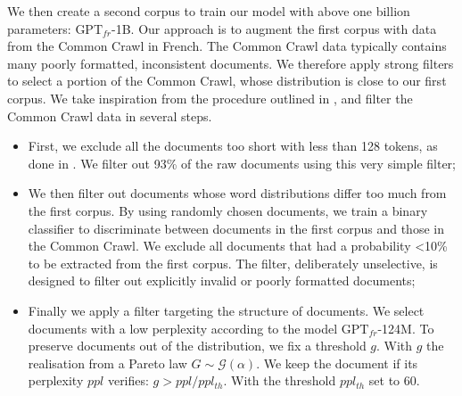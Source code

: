 We then create a second corpus to train our model with above one billion parameters: $\text{GPT}_{fr}$-1B. Our approach is to augment the first corpus with data from the Common Crawl in French. The Common Crawl data typically contains many poorly formatted, inconsistent documents. We therefore apply strong filters to select a portion of the Common Crawl, whose distribution is close to our first corpus. We take inspiration from the procedure outlined in \textcite{brown_20}, and filter the Common Crawl data in several steps.
\begin{itemize}
    \item First, we exclude all the documents too short with less than 128 tokens, as done in \textcite{shoeybi_19}. We filter out 93\% of the raw documents using this very simple filter; 
    \item We then filter out documents whose word distributions differ too much from the first corpus. By using  randomly chosen documents, we train a binary classifier to discriminate between documents in the first corpus and those in the Common Crawl. We exclude all documents that had a probability <10\% to be extracted from the first corpus. The filter, deliberately unselective, is designed to filter out explicitly invalid or poorly formatted documents;
    \item Finally we apply a filter targeting the structure of documents. We select documents with a low perplexity according to the model $\text{GPT}_{fr}$-124M. To preserve documents out of the distribution, we fix a threshold $g$. With $g$ the realisation from a Pareto law $G \sim \mathcal{G}(\alpha)$. We keep the document if its perplexity $ppl$ verifies: $g > ppl / ppl_{th}$. With the threshold $ppl_{th}$ set to $60$. 
\end{itemize}


